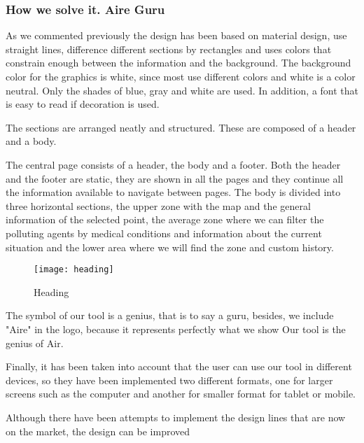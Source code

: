 \subsubsection{How we solve it. Aire Guru} 
As we commented previously the design has been based on material design, use straight lines, difference
different sections by rectangles and uses colors that constrain enough between the information and the background.
The background color for the graphics is white, since most use different colors and white is a color
neutral. Only the shades of blue, gray and white are used. In addition, a font that is easy to read if decoration is used.

The sections are arranged neatly and structured. These are composed of a header and a body.

The central page consists of a header, the body and a footer. Both the header and the footer are static,
they are shown in all the pages and they continue all the information available to navigate between pages.
The body is divided into three horizontal sections, the upper zone with the map and the general information of the selected point,
the average zone where we can filter the polluting agents by medical conditions and information about the current situation and the
lower area where we will find the zone and custom history.

\begin{figure}[ht]
    \centering
    \texttt{[image: heading]}
    \caption{Heading}
\end{figure}
 
    The symbol of our tool is a genius, that is to say a guru, besides, we include "Aire" in the logo, because it represents perfectly
    what we show Our tool is the genius of Air.
    
    Finally, it has been taken into account that the user can use our tool in different devices, so they have been implemented
    two different formats, one for larger screens such as the computer and another for smaller format for tablet or mobile.
\begin{itemize}
    \done
    \crossed Although there have been attempts to implement the design lines that are now on the market, the design can be improved
    
\end{itemize}
\newpage